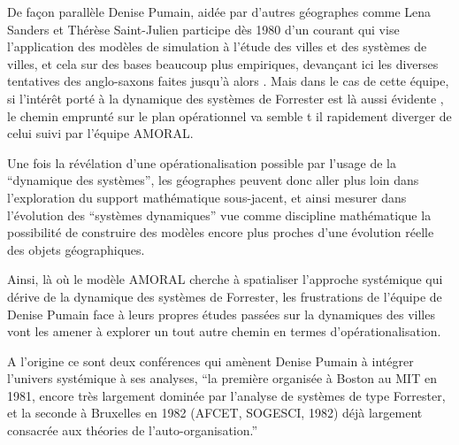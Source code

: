 
De façon parallèle Denise Pumain, aidée par d'autres géographes comme Lena Sanders et Thérèse Saint-Julien participe dès 1980 d'un courant \autocite{Pumain1983, Pumain1984, Pumain1989} qui vise l'application des modèles de simulation à l'étude des villes et des systèmes de villes, et cela sur des bases beaucoup plus empiriques, devançant ici les diverses tentatives des anglo-saxons faites jusqu'à alors \autocite[99-100]{Pumain1989}. Mais dans le cas de cette équipe, si l’intérêt porté à la dynamique des systèmes de Forrester est là aussi évidente \autocite{Pumain1983, Pumain1984}, le chemin emprunté sur le plan opérationnel va semble t il rapidement diverger de celui suivi par l'équipe AMORAL.

Une fois la révélation d'une opérationalisation possible par l'usage de la \enquote{dynamique des systèmes}, les géographes peuvent donc aller plus loin dans l'exploration du support mathématique sous-jacent, et ainsi mesurer dans l'évolution des \enquote{systèmes dynamiques} vue comme discipline mathématique la possibilité de construire des modèles encore plus proches d'une évolution réelle des objets géographiques.

Ainsi, là où le modèle AMORAL cherche à spatialiser l'approche systémique qui dérive de la dynamique des systèmes de Forrester, les frustrations de l'équipe de Denise Pumain face à leurs propres études passées sur la dynamiques des villes vont les amener à explorer un tout autre chemin en termes d'opérationalisation.

A l'origine ce sont deux conférences qui amènent Denise Pumain à intégrer l'univers systémique à ses analyses, \enquote{la première organisée à Boston au MIT en 1981, encore très largement dominée par l’analyse de systèmes de type Forrester, et la seconde à Bruxelles en 1982 (AFCET, SOGESCI, 1982) déjà largement consacrée aux théories de l’auto-organisation.} \textcite[27]{Pumain2003} \autocites[27]{Pumain2003}{Schmid2014}

